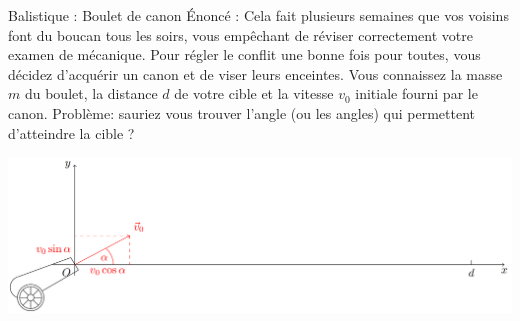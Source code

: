 \documentclass[xcolor=table]{beamer}
\begin{document}
\begin{frame}{Balistique : Boulet de canon} 
Énoncé : Cela fait plusieurs semaines que vos voisins font du boucan tous les soirs, vous empêchant de réviser correctement votre examen de mécanique. Pour régler le conflit une bonne fois pour toutes, vous décidez d'acquérir un canon et de viser leurs enceintes. Vous connaissez la masse $m$ du boulet, la distance $d$ de votre cible et la vitesse $v_0$ initiale fourni par le canon. Problème: sauriez vous trouver l'angle (ou les angles) qui permettent d'atteindre la cible ?
\begin{center}
    \includegraphics[scale = 0.5]{Images/Canon}
\end{center}
    
\end{frame}
\end{document}
